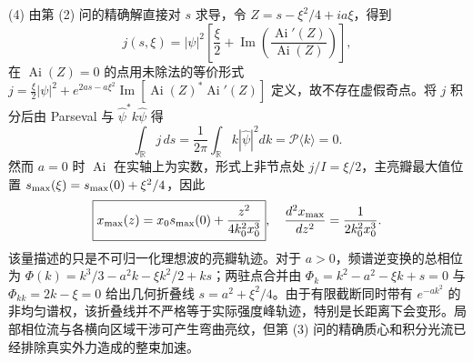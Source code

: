 (4) 由第 (2) 问的精确解直接对 \(s\) 求导，令 \(Z=s-\xi^2/4+ia\xi\)，得到
\[
\boxed{j(s,\xi)=|\psi|^2\left[
\frac{\xi}{2}+\operatorname{Im}\left(\frac{\operatorname{Ai}'(Z)}{\operatorname{Ai}(Z)}\right)\right]},
\]
在 \(\operatorname{Ai}(Z)=0\) 的点用未除法的等价形式
\(j=\frac{\xi}{2}|\psi|^2+e^{2as-a\xi^2}\operatorname{Im}[\operatorname{Ai}(Z)^*\operatorname{Ai}'(Z)]\) 定义，故不存在虚假奇点。将 \(j\) 积分后由 Parseval 与 \(\widehat\psi^*k\widehat\psi\) 得
\[
\boxed{\int_{\mathbb R}j\,ds
=\frac1{2\pi}\int_{\mathbb R}k|\widehat\psi|^2dk
=\mathcal P\langle k\rangle=0}.
\]
然而 \(a=0\) 时 \(\operatorname{Ai}\) 在实轴上为实数，形式上非节点处 \(j/I=\xi/2\)，主亮瓣最大值位置 \(s_{\rm max}(\xi)=s_{\rm max}(0)+\xi^2/4\)，因此
\[
\boxed{x_{\rm max}(z)=x_0s_{\rm max}(0)+\frac{z^2}{4k_0^2x_0^3}},
\quad \frac{d^2x_{\rm max}}{dz^2}=\frac1{2k_0^2x_0^3}.
\]
该量描述的只是不可归一化理想波的亮瓣轨迹。对于 \(a>0\)，频谱逆变换的总相位为
\(\Phi(k)=k^3/3-a^2k-\xi k^2/2+ks\)；两驻点合并由
\(\Phi_k=k^2-a^2-\xi k+s=0\) 与 \(\Phi_{kk}=2k-\xi=0\) 给出几何折叠线 \(s=a^2+\xi^2/4\)。由于有限截断同时带有 \(e^{-ak^2}\) 的非均匀谱权，该折叠线并不严格等于实际强度峰轨迹，特别是长距离下会变形。局部相位流与各横向区域干涉可产生弯曲亮纹，但第 (3) 问的精确质心和积分光流已经排除真实外力造成的整束加速。